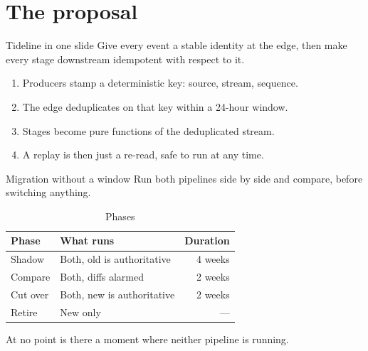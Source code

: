 \documentclass[aspectratio=169,11pt]{beamer}
\begin{document}
\section{The proposal}

\begin{frame}{Tideline in one slide}
  Give every event a stable identity at the edge, then make every stage
  downstream idempotent with respect to it.

  \begin{enumerate}
    \item<1-> Producers stamp a deterministic key: source, stream, sequence.
    \item<2-> The edge deduplicates on that key within a 24-hour window.
    \item<3-> Stages become pure functions of the deduplicated stream.
    \item<4-> A replay is then just a re-read, safe to run at any time.
  \end{enumerate}

\end{frame}

\begin{frame}{Migration without a window}
  Run both pipelines side by side and compare, before switching anything.

  \begin{table}
    \centering
    \caption{Phases}
    \begin{tabular}{llr}
      \toprule
      Phase & What runs & Duration \\
      \midrule
      Shadow    & Both, old is authoritative & 4 weeks \\
      Compare   & Both, diffs alarmed        & 2 weeks \\
      Cut over  & Both, new is authoritative & 2 weeks \\
      Retire    & New only                   & --- \\
      \bottomrule
    \end{tabular}
  \end{table}

  At no point is there a moment where neither pipeline is running.
\end{frame}
\end{document}
